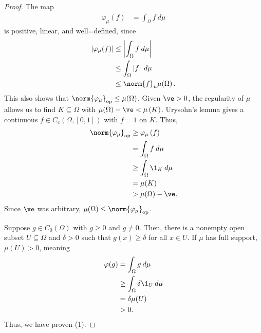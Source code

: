 \documentclass[10pt]{mypackage}
\begin{document}
\begin{proof}
  The map
  \begin{align*}
    \varphi_{\mu}\left(f\right) &= \int_{\Omega}f\:d\mu
  \end{align*}
  is positive, linear, and well=defined, since
  \begin{align*}
    \left\vert \varphi_{\mu}(f) \right\vert &\leq \left\vert \int_{\Omega}f\:d\mu \right\vert\\
                                            &\leq \int_{\Omega}\left\vert f \right\vert\:d\mu\\
                                            &\leq \norm{f}_{u} \mu\!\left(\Omega\right).
  \end{align*}
  This also shows that $\norm{\varphi_{\mu}}_{\text{op}}\leq \mu\!\left(\Omega\right)$. Given $\ve > 0$, the regularity of $\mu$ allows us to find $K\subseteq \Omega$ with $\mu\!\left(\Omega\right)-\ve < \mu\left(K\right)$. Urysohn's lemma gives a continuous $f\in C_c\left(\Omega,[0,1]\right)$ with $f = 1$ on $K$. Thus,
  \begin{align*}
    \norm{\varphi_{\mu}}_{\text{op}} &\geq \varphi_{\mu}\left(f\right)\\
                                     &= \int_{\Omega}f\:d\mu\\
                                     &\geq \int_{\Omega}\1_{K}\:d\mu\\
                                     &= \mu\!\left(K\right)\\
                                     &> \mu\!\left(\Omega\right) - \ve.
  \end{align*}
  Since $\ve$ was arbitrary, $\mu\!\left(\Omega\right)\leq \norm{\varphi_{\mu}}_{\text{op}}$.\newline

  Suppose $g\in C_0\left(\Omega\right)$ with $g\geq 0$ and $g\neq 0$. Then, there is a nonempty open subset $U\subseteq \Omega$ and $\delta > 0$ such that $g(x) \geq \delta$ for all $x\in U$. If $\mu$ has full support, $\mu\!\left(U\right) > 0$, meaning
  \begin{align*}
    \varphi(g) &= \int_{\Omega}g\:d\mu\\
               &\geq \int_{\Omega}\delta\1_{U}\:d\mu\\
               &= \delta\mu\!\left(U\right)\\
               &> 0.
  \end{align*}
  Thus, we have proven (1).\newline


\end{proof}
\end{document}
